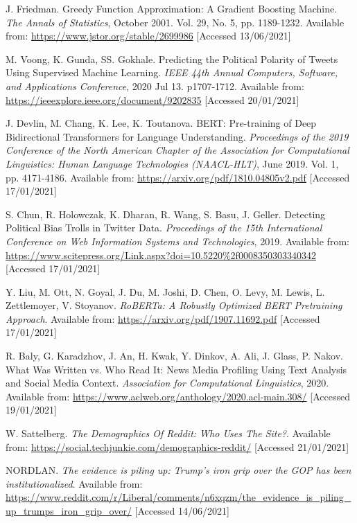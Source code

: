 \begin{thebibliography}{9}
J. Friedman. Greedy Function Approximation: A Gradient Boosting Machine. \textit{The Annals of Statistics}, October 2001. Vol. 29, No. 5, pp. 1189-1232. Available from: \url{https://www.jstor.org/stable/2699986} [Accessed 13/06/2021]

M. Voong, K. Gunda, SS. Gokhale. Predicting the Political Polarity of Tweets Using Supervised Machine Learning. \textit{IEEE 44th Annual Computers, Software, and Applications Conference}, 2020 Jul 13. p1707-1712. Available from: \url{https://ieeexplore.ieee.org/document/9202835} [Accessed 20/01/2021]

J. Devlin, M. Chang, K. Lee, K. Toutanova. BERT: Pre-training of Deep Bidirectional Transformers for Language Understanding. \textit{Proceedings of the 2019 Conference of the North American Chapter of the Association for Computational Linguistics: Human Language Technologies (NAACL-HLT)}, June 2019. Vol. 1, pp. 4171-4186. Available from: \url{https://arxiv.org/pdf/1810.04805v2.pdf} [Accessed 17/01/2021]

S. Chun, R. Holowczak, K. Dharan, R. Wang, S. Basu, J. Geller. Detecting Political Bias Trolls in Twitter Data. \textit{Proceedings of the 15th International Conference on Web Information Systems and Technologies}, 2019. Available from: \url{https://www.scitepress.org/Link.aspx?doi=10.5220\%2f0008350303340342} [Accessed 17/01/2021]

Y. Liu, M. Ott, N. Goyal, J. Du, M. Joshi, D. Chen, O. Levy, M. Lewis, L. Zettlemoyer, V. Stoyanov. \textit{RoBERTa: A Robustly Optimized BERT Pretraining Approach}. Available from: \url{https://arxiv.org/pdf/1907.11692.pdf} [Accessed 17/01/2021]

R. Baly, G. Karadzhov, J. An, H. Kwak, Y. Dinkov, A. Ali, J. Glass, P. Nakov. What Was Written vs. Who Read It:
News Media Profiling Using Text Analysis and Social Media Context. \textit{Association for Computational Linguistics}, 2020. Available from: \url{https://www.aclweb.org/anthology/2020.acl-main.308/} [Accessed 19/01/2021]

W. Sattelberg. \textit{The Demographics Of Reddit: Who Uses The Site?}. Available from: \url{https://social.techjunkie.com/demographics-reddit/} [Accessed 21/01/2021]

NORDLAN. \textit{The evidence is piling up: Trump's iron grip over the GOP has been institutionalized}. Available from: \url{https://www.reddit.com/r/Liberal/comments/n6xqzm/the_evidence_is_piling_up_trumps_iron_grip_over/} [Accessed 14/06/2021]


\end{thebibliography}
